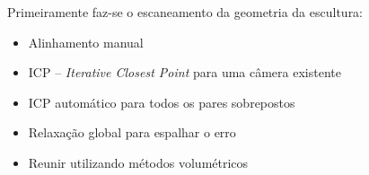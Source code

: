 


Primeiramente faz-se o escaneamento da geometria da escultura:

\begin{itemize}
\item{Alinhamento manual}
\item{ICP -- \emph{Iterative Closest Point} para uma câmera existente} %
\item{ICP automático para todos os pares sobrepostos}
\item{Relaxação global para espalhar o erro}
\item{Reunir utilizando métodos volumétricos}
\end{itemize}


